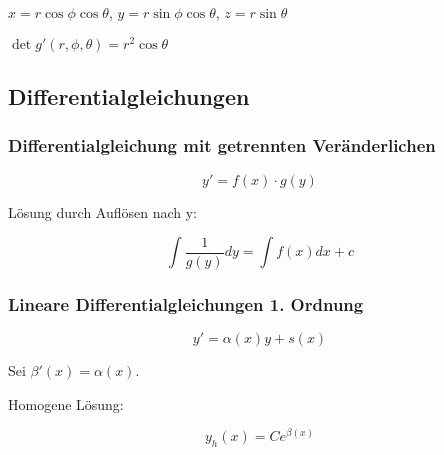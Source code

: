 \documentclass[]{article}
\begin{document}
\begin{enumerate}[1.]
						\begin{math} x = r \cos \phi \cos \theta \end{math},
						\begin{math} y = r \sin \phi \cos \theta \end{math},
						\begin{math} z = r \sin \theta \end{math}
						
						\begin{math} \det g'(r, \phi, \theta) = r^2 \cos \theta \end{math}
				\end{enumerate}
	
		\subsection{Differentialgleichungen}
	
			\subsubsection{Differentialgleichung mit getrennten Veränderlichen}
			
				\begin{displaymath}
					y' = f(x) \cdot g(y)
				\end{displaymath}
		
				Lösung durch Auflösen nach y:
		
				\begin{displaymath}
					\int \frac{1}{g(y)} dy = \int f(x) dx +c
				\end{displaymath}
		
			\subsubsection{Lineare Differentialgleichungen 1. Ordnung}
				
				\begin{displaymath}
					y' = \alpha(x)y + s(x)
				\end{displaymath}
				
				Sei \begin{math} \beta'(x) = \alpha(x) \end{math}.
				
				Homogene Lösung:
						
				\begin{displaymath}
					y_h(x) = Ce^{\beta(x)}
				\end{displaymath}
				
\end{document}

